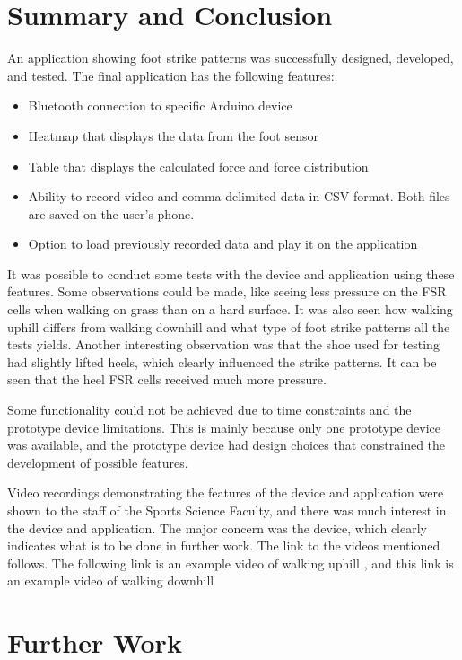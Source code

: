 \graphicspath{{conclusion/fig/}}

\chapter{Summary and Conclusion}
\label{chap:conclusion}
An application showing foot strike patterns was successfully designed, developed, and tested. The final application has the following features:
\begin{itemize}
    \item Bluetooth connection to specific Arduino device
    \item Heatmap that displays the data from the foot sensor
    \item Table that displays the calculated force and force distribution
    \item Ability to record video and comma-delimited data in CSV format. Both files are saved on the user's phone.
    \item Option to load previously recorded data and play it on the application
  \end{itemize}

  It was possible to conduct some tests with the device and application using these features. Some observations could be made, like seeing less pressure on the FSR cells when walking on grass than on a hard surface. It was also seen how walking uphill differs from walking downhill and what type of foot strike patterns all the tests yields. Another interesting observation was that the shoe used for testing had slightly lifted heels, which clearly influenced the strike patterns. It can be seen that the heel FSR cells received much more pressure.

  Some functionality could not be achieved due to time constraints and the prototype device limitations. This is mainly because only one prototype device was available, and the prototype device had design choices that constrained the development of possible features.

  Video recordings demonstrating the features of the device and application were shown to the staff of the Sports Science Faculty, and there was much interest in the device and application. The major concern was the device, which clearly indicates what is to be done in further work. The link to the videos mentioned follows. The following link is an example video of walking uphill \cite{dewaldtsnymanup2022}, and this link \cite{dewaldtsnymandown2022} is an example video of walking downhill 
\clearpage
\chapter{Further Work}
\label{chap:furtherwork}

